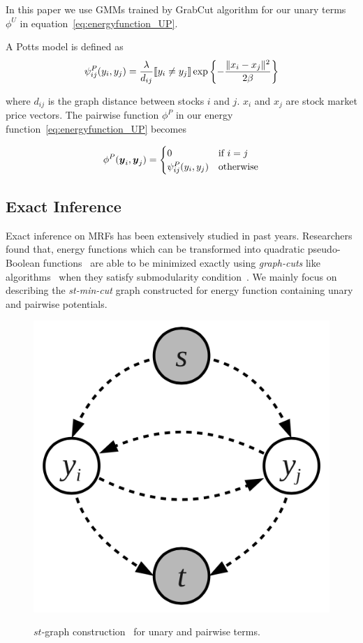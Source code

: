 In this paper we use GMMs trained by GrabCut algorithm for our
unary terms $\phi^U$ in equation~\eqref{eq:energyfunction_UP}.

A Potts model is defined as
\begin{align}
  \label{eq:potts}
  \psi^P_{ij}(y_i, y_j) = \frac{\lambda}{d_{ij}} \ind{y_i \neq
      y_j} \exp\left\{- \frac{\|x_i - x_j\|^2}{2 \beta}\right\}
\end{align}

\noindent where $d_{ij}$ is the graph distance between stocks $i$
and $j$. $x_i$ and $x_j$ are stock market price vectors. The
pairwise function $\phi^P$ in our energy
function~\eqref{eq:energyfunction_UP} becomes

\begin{align}
  \label{eq:energyfunction_pairwise}
  \phi^P(\by_i,\by_j)=
  \begin{cases}
    0 & \text{if } i = j \\
    \psi^P_{ij}(y_i, y_j) &
    \text{otherwise}
  \end{cases}
\end{align}


\subsection{Exact Inference}
\label{sec:exact_inference}

Exact inference on MRFs has been extensively studied in past
years. Researchers found that, energy functions which can be
transformed into quadratic pseudo-Boolean
functions~\cite{Ishikawa:PAMI03,Ishikawa:CVPR09,Rother:CVPR09}
are able to be minimized exactly using \emph{graph-cuts} like
algorithms~\cite{Freedman:CVPR05,Hammer:1965} when they satisfy
submodularity condition~\cite{Boros:MATH02}. We mainly focus on
describing the \emph{st-min-cut} graph constructed for energy
function containing unary and pairwise potentials.

\begin{figure}[b]
  \centering
    \includegraphics[width=0.5\columnwidth]{Methodology/figures/unary_pairwise.png}\\
  \caption{\label{fig:stmincut} $st$-graph
    construction~\cite{gouldlearning} for unary and pairwise
    terms.}
\end{figure}

